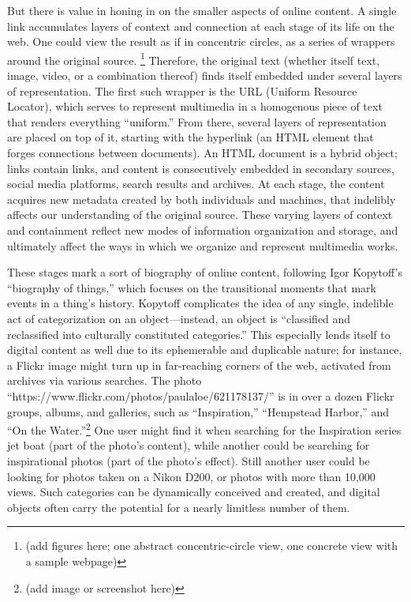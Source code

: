 But there is value in honing in on the smaller aspects of online content. A single link accumulates layers of context and connection at each stage of its life on the web. One could view the result as if in concentric circles, as a series of wrappers around the original source. \footnote{(add figures here; one abstract concentric-circle view, one concrete view with a sample webpage)} Therefore, the original text (whether itself text, image, video, or a combination thereof) finds itself embedded under several layers of representation. The first such wrapper is the URL (Uniform Resource Locator), which serves to represent multimedia in a homogenous piece of text that renders everything ``uniform.'' From there, several layers of representation are placed on top of it, starting with the hyperlink (an HTML element that forges connections between documents). An HTML document is a hybrid object; links contain links, and content is consecutively embedded in secondary sources, social media platforms, search results and archives. At each stage, the content acquires new metadata created by both individuals and machines, that indelibly affects our understanding of the original source. These varying layers of context and containment reflect new modes of information organization and storage, and ultimately affect the ways in which we organize and represent multimedia works.

These stages mark a sort of biography of online content, following Igor Kopytoff's ``biography of things,'' which focuses on the transitional moments that mark events in a thing's history.  Kopytoff complicates the idea of any single, indelible act of categorization on an object---instead, an object is ``classified and reclassified into culturally constituted categories.''\autocite[68]{appadurai_cultural_1986} This especially lends itself to digital content as well due to its ephemerable and duplicable nature; for instance, a Flickr image might turn up in far-reaching corners of the web, activated from archives via various searches. The photo ``https://www.flickr.com/photos/paulaloe/621178137/'' is in over a dozen Flickr groups, albums, and galleries, such as ``Inspiration,'' ``Hempstead Harbor,'' and ``On the Water.''\footnote{(add image or screenshot here)} One user might find it when searching for the Inspiration series jet boat (part of the photo's content), while another could be searching for inspirational photos (part of the photo's effect). Still another user could be looking for photos taken on a Nikon D200, or photos with more than 10,000 views. Such categories can be dynamically conceived and created, and digital objects often carry the potential for a nearly limitless number of them.

